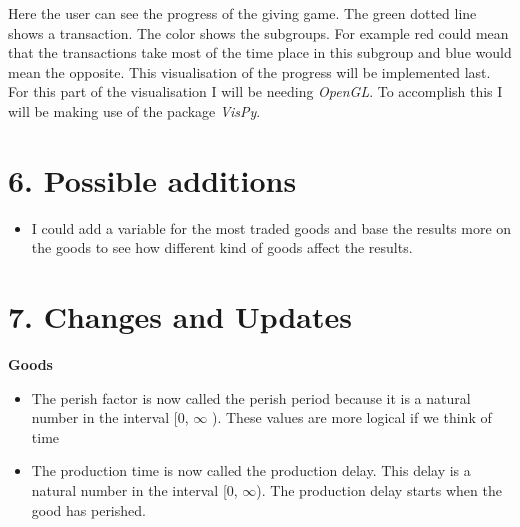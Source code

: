 \documentclass{article}
\begin{document}
Here the user can see the progress of the giving game. The green dotted line shows a transaction. The color shows the subgroups. For example red could mean that the transactions take most of the time place in this subgroup and blue would mean the opposite. This visualisation of the progress will be implemented last. For this part of the visualisation I will be needing \textit{OpenGL}. To accomplish this I will be making use of the package \textit{VisPy}.

\section{6. Possible additions}
\begin{itemize}
  \item I could add a variable for the most traded goods and base the results more on the goods to see how different kind of goods affect the results. 
\end{itemize}

\section{7. Changes and Updates}
\textbf{Goods}
\begin{itemize}
  \item The perish factor is now called the perish period because it is a natural number in the interval [0, $\infty$ ). These values are more logical if we think of time
  \item The production time is now called the production delay. This delay is a natural number in the interval [0,  $\infty$). The production delay starts when the good has perished.
\end{itemize}





\end{document}
